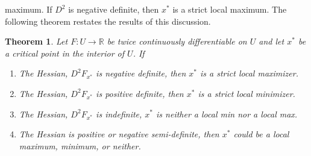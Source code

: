 \documentclass[12pt,reqno]{amsart}
\newtheorem{theorem}{Theorem}[section]
\theoremstyle{definition}
\def\R{\mathbb{R}}
\renewcommand{\to}{{\rightarrow}}
\begin{document}
maximum. If $D^2$ is negative definite, then $x^*$ is a strict local
maximum. The following theorem restates the results of this
discussion.
\begin{theorem}\label{thm:soc}
  Let $F: U \to \R$ be twice continuously differentiable on $U$ and
  let $x^*$ be a critical point in the interior of $U$. If
  \begin{enumerate}
  \item\label{c:smax} The Hessian, $D^2 F_{x^*}$ is negative definite,
    then $x^*$ is a strict local maximizer.  
  \item The Hessian, $D^2 F_{x^*}$ is positive definite, then $x^*$ is
    a strict local minimizer. 
  \item The Hessian, $D^2 F_{x^*}$ is indefinite, $x^*$ is neither a
    local min nor a local max.
  \item\label{c:ambig} The Hessian is positive or negative
    semi-definite, then $x^*$ could be a local maximum, minimum, or
    neither. 
  \end{enumerate}
\end{theorem}
\end{document}
